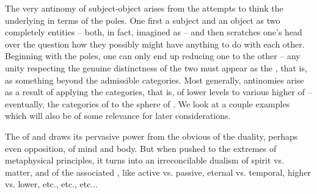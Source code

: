 The very antinomy of subject-object arises from the attempts to think the
underlying  in terms of the  poles. One first
 a subject and an object as two completely  entities
-- both, in fact, imagined as  -- and then scratches one's head over
the question how they possibly might have anything to do with each
other. Beginning with the  poles, one can only end up
reducing one to the other -- any unity respecting the genuine distinctness of
the two must appear as
 the , that is, as something   
beyond the admissible categories. 
Most generally, antinomies arise as a result of applying the categories,
that is,  of lower levels to various higher  of
 -- eventually, the categories of
 to the sphere of . We look at a couple examples which will also
be of some relevance for later considerations. 

\label{pa:matter}
%
%
The  of  and  draws
its pervasive power from the obvious  of the duality, perhaps even
opposition, of mind and body. But when pushed to the extremes of metaphysical
principles, it turns into an irreconcilable dualism of spirit vs. matter, and
of the associated , like active vs. passive, eternal vs. temporal,
higher vs. lower, etc., etc., etc...


